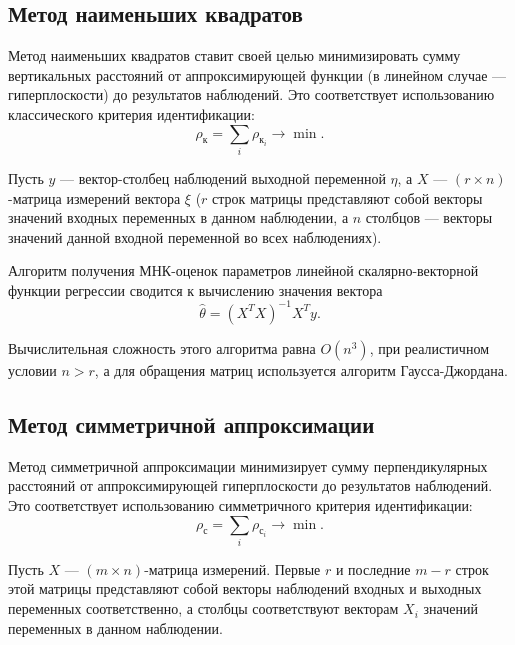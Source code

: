 \subsection{Метод наименьших квадратов}

Метод наименьших квадратов ставит своей целью минимизировать сумму вертикальных расстояний
от аппроксимирующей функции (в линейном случае --- гиперплоскости) до результатов наблюдений.
Это соответствует использованию классического критерия идентификации:
\begin{equation*}
  \rho_{\text{к}} = \sum_i \rho_{\text{к}_i} \rightarrow \min.
\end{equation*}

Пусть \( y \) --- вектор-столбец наблюдений выходной переменной \( \eta \),
а \( X \) --- \( (r \times n) \)-матрица измерений вектора \( \xi \)
(\( r \) строк матрицы представляют собой векторы значений входных переменных в данном наблюдении,
а \( n \) столбцов --- векторы значений данной входной переменной во всех наблюдениях).

Алгоритм получения МНК-оценок параметров линейной скалярно-векторной функции регрессии сводится
к вычислению значения вектора~\cite{wiki_lse}
\begin{equation*}
  \hat{\theta} = (X^{T}X)^{-1}X^{T} y.
\end{equation*}

Вычислительная сложность этого алгоритма равна \( O(n^3) \),
при реалистичном условии \( n > r \),
а для обращения матриц используется алгоритм Гаусса-Джордана.

\vspace{2\baselineskip}
\subsection{Метод симметричной аппроксимации}

Метод симметричной аппроксимации минимизирует сумму перпендикулярных расстояний
от аппроксимирующей гиперплоскости до результатов наблюдений.
Это соответствует использованию симметричного критерия идентификации:
\begin{equation*}
  \rho_{\text{с}} = \sum_i \rho_{\text{с}_i} \rightarrow \min.
\end{equation*}

Пусть \( X \) --- \( (m \times n) \)-матрица измерений.
Первые \( r \) и последние \( m - r \) строк этой матрицы представляют собой векторы наблюдений
входных и выходных переменных соответственно,
а столбцы соответствуют векторам \( X_i \) значений переменных в данном наблюдении.

